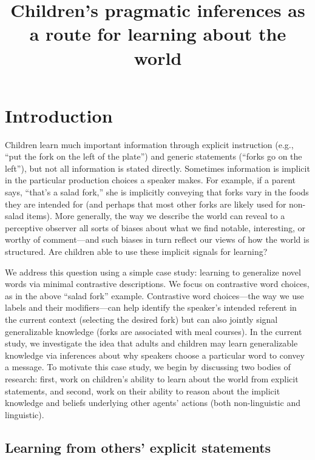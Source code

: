 \documentclass[man]{apa2}
\title{Children's pragmatic inferences as a route for learning about the world}
\begin{document}
\maketitle                            


\section{Introduction}

Children learn much important information through explicit instruction (e.g., ``put the fork on the left of the plate'') and generic statements (``forks go on the left''), but not all information is stated directly. Sometimes information is implicit in the particular production choices a speaker makes. For example, if a parent says, ``that's a salad fork,'' she is implicitly conveying that forks vary in the foods they are intended for (and perhaps that most other forks are likely used for non-salad items). More generally, the way we describe the world can reveal to a perceptive observer all sorts of biases about what we find notable, interesting, or worthy of comment---and such biases in turn reflect our views of how the world is structured. Are children able to use these implicit signals for learning? 

We address this question using a simple case study: learning to generalize novel words via minimal contrastive descriptions.  We focus on contrastive word choices, as in the above ``salad fork'' example. Contrastive word choices---the way we use labels and their modifiers---can help identify the speaker's intended referent in the current context (selecting the desired fork) but can also jointly signal generalizable knowledge (forks are associated with meal courses). In the current study, we investigate the idea that adults and children may learn generalizable knowledge via inferences about why speakers choose a particular word to convey a message. To motivate this case study, we begin by discussing two bodies of research: first, work on children's ability to learn about the world from explicit statements, and second, work on their ability to reason about the implicit knowledge and beliefs underlying other agents' actions (both non-linguistic and linguistic). 


\subsection{Learning from others' explicit statements}
\end{document}
